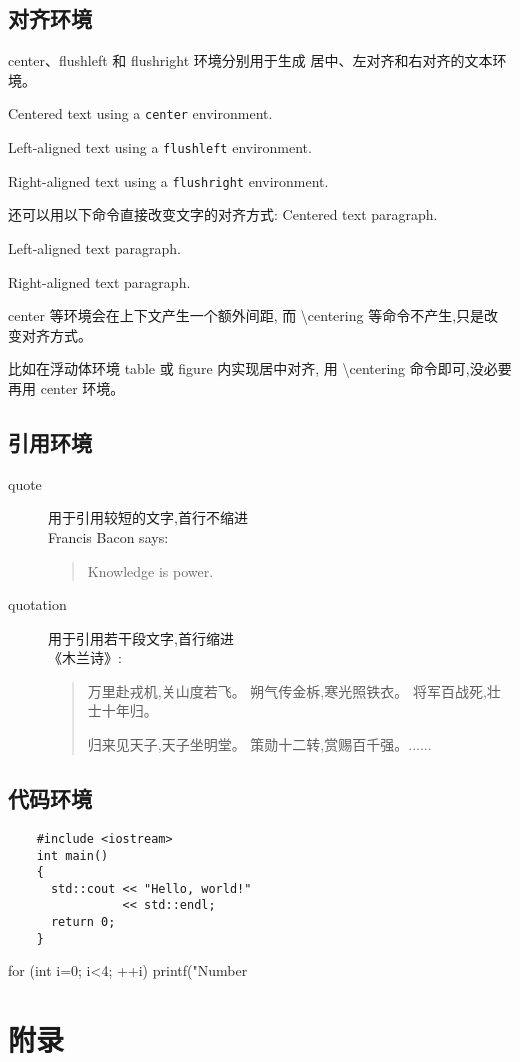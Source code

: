 \documentclass[a4paper]{ctexart}
\begin{document}
\subsection{对齐环境}
center、flushleft 和 flushright 环境分别用于生成%
居中、左对齐和右对齐的文本环境。
\begin{center}
    Centered text using a
    \verb|center| environment.
\end{center}
\begin{flushleft}
    Left-aligned text using a
    \verb|flushleft| environment.
\end{flushleft}
\begin{flushright}
    Right-aligned text using a
    \verb|flushright| environment.
\end{flushright}
还可以用以下命令直接改变文字的对齐方式:
\centering
Centered text paragraph.\par
\raggedright
Left-aligned text paragraph.\par
\raggedleft
Right-aligned text paragraph.\par
\begin{flushleft}
    center 等环境会在上下文产生一个额外间距,%
    而 \textbackslash centering 等命令不产生,只是改变对齐方式。%
\end{flushleft}
\raggedright
比如在浮动体环境 table 或 figure 内实现居中对齐,%
用 \textbackslash centering 命令即可,没必要再用 center 环境。
\subsection{引用环境}
\begin{description}
    \item[quote] 用于引用较短的文字,首行不缩进\\
    Francis Bacon says:
    \begin{quote}
        Knowledge is power.
    \end{quote}
    \item[quotation] 用于引用若干段文字,首行缩进\\
    《木兰诗》:
    \begin{quotation}
        万里赴戎机,关山度若飞。
        朔气传金柝,寒光照铁衣。
        将军百战死,壮士十年归。

        归来见天子,天子坐明堂。
        策勋十二转,赏赐百千强。......
    \end{quotation} 
\end{description}
\subsection{代码环境}
\begin{verbatim}
    #include <iostream>
    int main() 
    {
      std::cout << "Hello, world!"
                << std::endl;
      return 0;
    }
\end{verbatim}
\begin{verbatim*}
    for (int i=0; i<4; ++i)
      printf("Number %d\n",i);
\end{verbatim*}
    


\appendix
\section{附录}
\end{document}
